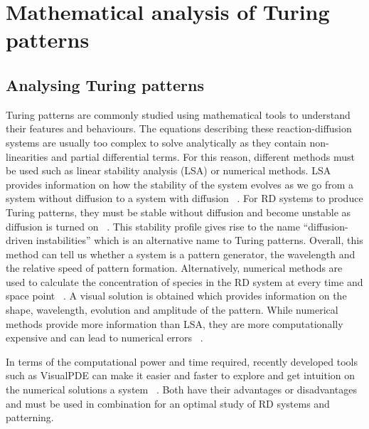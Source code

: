 

%
\section{Mathematical analysis of Turing patterns}

\subsection{Analysing Turing patterns}
Turing patterns are commonly studied using mathematical tools to understand their features and behaviours.
The equations describing these reaction-diffusion systems are usually too complex to solve analytically as they contain non-linearities and partial differential terms.
For this reason, different methods must be used such as linear stability analysis (LSA) or numerical methods.
LSA provides information on how the stability of the system evolves as we go from a system without diffusion to a system with diffusion ~\parencite{Glendinning1994}.
For RD systems to produce Turing patterns, they must be stable without diffusion and become unstable as diffusion is turned on ~\parencite{J.DMurray2002}.
This stability profile gives rise to the name “diffusion-driven instabilities” which is an alternative name to Turing patterns.
Overall, this method can tell us whether a system is a pattern generator, the wavelength and the relative speed of pattern formation.
Alternatively, numerical methods are used to calculate the concentration of species in the RD system at every time and space point ~\parencite{Ramos1983}.
A visual solution is obtained which provides information on the shape, wavelength, evolution and amplitude of the pattern.
While numerical methods provide more information than LSA, they are more computationally expensive and can lead to numerical errors ~\parencite{J.DMurray2002}.

In terms of the computational power and time required, recently developed tools such as VisualPDE can make it easier and faster to explore and get intuition on the numerical solutions a system ~\parencite{Walker2023}.
Both have their advantages or disadvantages and must be used in combination for an optimal study of RD systems and patterning.
